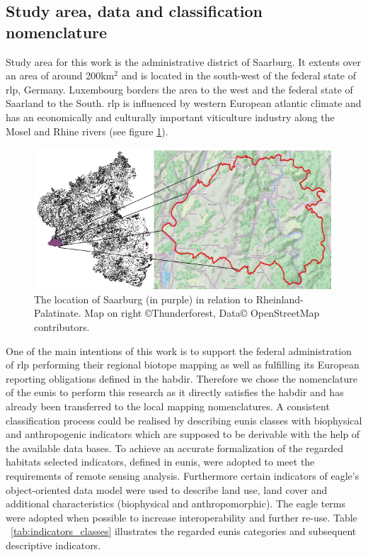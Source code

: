 \documentclass[authoryear,review,12pt,number]{elsarticle}
\begin{document}
\subsection{Study area, data and classification nomenclature}
\label{sec:usecase_data}
Study area for this work is the administrative district of Saarburg. It extents
over an area of around 200km$^{2}$ and is
located in the south-west of the federal state of \gls{rlp}, Germany.
Luxembourg borders the area to the west and the federal state of Saarland to the
South. \gls{rlp} is influenced by western European atlantic climate and has an
economically and culturally important viticulture industry along the Mosel and Rhine rivers
(see figure \ref{fig:study_area}).
\begin{figure}
    \includegraphics[width=\textwidth]{diagrams/study_area_closeup.png}
    \caption{The location of Saarburg (in purple) in relation to
    Rheinland-Palatinate. Map on right \copyright Thunderforest, Data\copyright
    OpenStreetMap contributors.}
\label{fig:study_area}
\end{figure}

One of the main intentions of this work is to support the federal administration
of \gls{rlp} performing their regional biotope mapping as well as fulfilling its
European reporting obligations defined in the \gls{habdir}. Therefore we chose
the nomenclature of the \gls{eunis} to perform this research as it directly
satisfies the \gls{habdir} and has already been transferred to the local mapping
nomenclatures. A consistent classification process could be realised by
describing \gls{eunis} classes with biophysical and anthropogenic indicators
which are supposed to be derivable with the help of the available data bases. To
achieve an accurate formalization of the regarded habitats selected indicators,
defined in \gls{eunis}, were adopted to meet the requirements of remote sensing
analysis.
Furthermore certain indicators of \gls{eagle}'s object-oriented data
model were used to describe land use, land cover and additional characteristics
(biophysical and anthropomorphic). The \gls{eagle} terms were adopted when possible to increase
interoperability and further re-use. Table ~\ref{tab:indicators_classes}
illustrates the regarded \gls{eunis} categories and subsequent descriptive
indicators.
\end{document}
